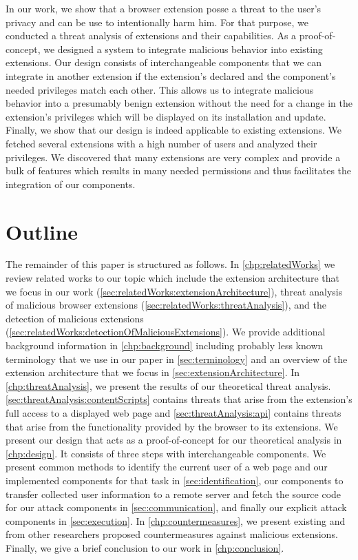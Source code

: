	In our work, we show that a browser extension posse a threat to the user's privacy and can be use to intentionally harm him. For that purpose, we conducted a threat analysis of extensions and their capabilities. As a proof-of-concept, we designed a system to integrate malicious behavior into existing extensions. Our design consists of interchangeable components that we can integrate in another extension if the extension's declared and the component's needed privileges match each other. This allows us to integrate malicious behavior into a presumably benign extension without the need for a change in the extension's privileges which will be displayed on its installation and update. \\
	Finally, we show that our design is indeed applicable to existing extensions. We fetched several extensions with a high number of users and analyzed their privileges. We discovered that many extensions are very complex and provide a bulk of features which results in many needed permissions and thus facilitates the integration of our components. 

\section{Outline}

	The remainder of this paper is structured as follows. In \autoref{chp:relatedWorks} we review related works to our topic which include the extension architecture that we focus in our work (\autoref{sec:relatedWorks:extensionArchitecture}), threat analysis of malicious browser extensions (\autoref{sec:relatedWorks:threatAnalysis}), and the detection of malicious extensions (\autoref{sec:relatedWorks:detectionOfMaliciousExtensions}). 
	We provide additional background information in \autoref{chp:background} including probably less known terminology that we use in our paper in \autoref{sec:terminology} and an overview of the extension architecture that we focus in \autoref{sec:extensionArchitecture}. 
	In \autoref{chp:threatAnalysis}, we present the results of our theoretical threat analysis. \autoref{sec:threatAnalysis:contentScripts} contains threats that arise from the extension's full access to a displayed web page and \autoref{sec:threatAnalysis:api} contains threats that arise from the functionality provided by the browser to its extensions.
	We present our design that acts as a proof-of-concept for our theoretical analysis in \autoref{chp:design}. It consists of three steps with interchangeable components. We present common methods to identify the current user of a web page and our implemented components for that task in \autoref{sec:identification}, our components to transfer collected user information to a remote server and fetch the source code for our attack components in \autoref{sec:communication}, and finally our explicit attack components in \autoref{sec:execution}.
	In \autoref{chp:countermeasures}, we present existing and from other researchers proposed countermeasures against malicious extensions.
	Finally, we give a brief conclusion to our work in \autoref{chp:conclusion}.